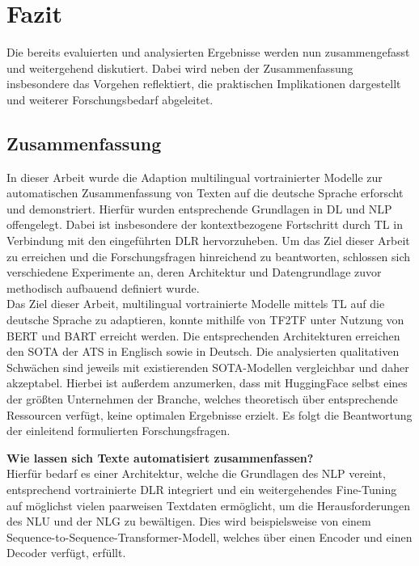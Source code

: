 \chapter{Fazit}
\thispagestyle{fancy}
\label{chap:Fazit}

\noindent
Die bereits evaluierten und analysierten Ergebnisse werden nun zusammengefasst und weitergehend diskutiert. Dabei wird neben der Zusammenfassung insbesondere das Vorgehen reflektiert, die praktischen Implikationen dargestellt und weiterer Forschungsbedarf abgeleitet.


\section{Zusammenfassung}
\noindent
In dieser Arbeit wurde die Adaption multilingual vortrainierter Modelle zur automatischen Zusammenfassung von Texten auf die deutsche Sprache erforscht und demonstriert. Hierfür wurden entsprechende Grundlagen in \ac{DL} und \ac{NLP} offengelegt. Dabei ist insbesondere der kontextbezogene Fortschritt durch \ac{TL} in Verbindung mit den eingeführten \ac{DLR} hervorzuheben. Um das Ziel dieser Arbeit zu erreichen und die Forschungsfragen hinreichend zu beantworten, schlossen sich verschiedene Experimente an, deren Architektur und Datengrundlage zuvor methodisch aufbauend definiert wurde.\\

\noindent
Das Ziel dieser Arbeit, multilingual vortrainierte Modelle mittels \ac{TL} auf die deutsche Sprache zu adaptieren, konnte mithilfe von \ac{TF2TF} unter Nutzung von \ac{BERT} und \ac{BART} erreicht werden. Die entsprechenden Architekturen erreichen den \ac{SOTA} der \ac{ATS} in Englisch sowie in Deutsch. Die analysierten qualitativen Schwächen sind jeweils mit existierenden \ac{SOTA}-Modellen vergleichbar und daher akzeptabel. Hierbei ist außerdem anzumerken, dass mit HuggingFace selbst eines der größten Unternehmen der Branche, welches theoretisch über entsprechende Ressourcen verfügt, keine optimalen Ergebnisse erzielt. Es folgt die Beantwortung der einleitend formulierten Forschungsfragen.
\newpage

\noindent
\textbf{Wie lassen sich Texte automatisiert zusammenfassen?}\\
\noindent
Hierfür bedarf es einer Architektur, welche die Grundlagen des \ac{NLP} vereint, entsprechend vortrainierte \ac{DLR} integriert und ein weitergehendes Fine-Tuning auf möglichst vielen paarweisen Textdaten ermöglicht, um die Herausforderungen des \ac{NLU} und der {NLG} zu bewältigen. Dies wird beispielsweise von einem Sequence-to-Sequence-Transformer-Modell, welches über einen Encoder und einen Decoder verfügt, erfüllt.\\

